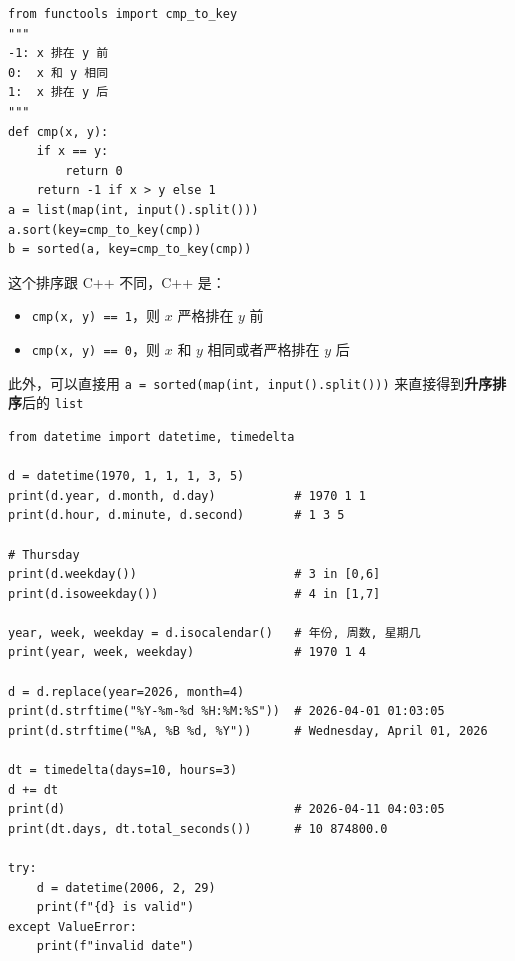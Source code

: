 \begin{lstlisting}[style=Python]
from functools import cmp_to_key
"""
-1: x 排在 y 前
0:  x 和 y 相同
1:  x 排在 y 后
"""
def cmp(x, y):
    if x == y:
        return 0
    return -1 if x > y else 1
a = list(map(int, input().split()))
a.sort(key=cmp_to_key(cmp))
b = sorted(a, key=cmp_to_key(cmp))
\end{lstlisting}

这个排序跟 C++ 不同，C++ 是：

\begin{itemize}
	\item \texttt{cmp(x, y) == 1}，则 $x$ 严格排在 $y$ 前
	\item \texttt{cmp(x, y) == 0}，则 $x$ 和 $y$ 相同或者严格排在 $y$ 后
\end{itemize}

此外，可以直接用 \texttt{a = sorted(map(int, input().split()))} 来直接得到\textbf{升序排序}后的 \texttt{list}

\newpage


\begin{lstlisting}[style=Python]
from datetime import datetime, timedelta

d = datetime(1970, 1, 1, 1, 3, 5)
print(d.year, d.month, d.day)           # 1970 1 1
print(d.hour, d.minute, d.second)       # 1 3 5

# Thursday
print(d.weekday())                      # 3 in [0,6]
print(d.isoweekday())                   # 4 in [1,7]

year, week, weekday = d.isocalendar()   # 年份, 周数, 星期几
print(year, week, weekday)              # 1970 1 4

d = d.replace(year=2026, month=4)
print(d.strftime("%Y-%m-%d %H:%M:%S"))  # 2026-04-01 01:03:05
print(d.strftime("%A, %B %d, %Y"))      # Wednesday, April 01, 2026

dt = timedelta(days=10, hours=3)
d += dt
print(d)                                # 2026-04-11 04:03:05
print(dt.days, dt.total_seconds())      # 10 874800.0

try:
    d = datetime(2006, 2, 29)
    print(f"{d} is valid")
except ValueError:
    print(f"invalid date")
\end{lstlisting}
